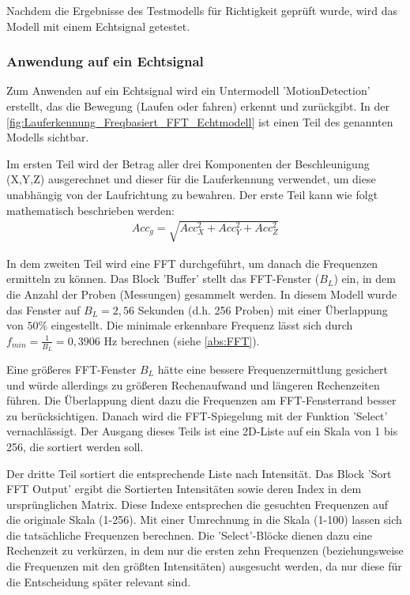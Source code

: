 Nachdem die Ergebnisse des Testmodells für Richtigkeit geprüft wurde, wird das Modell mit einem Echtsignal getestet. 

\subsubsection{Anwendung auf ein Echtsignal}

Zum Anwenden auf ein Echtsignal wird ein Untermodell 'MotionDetection' erstellt, das die Bewegung (Laufen oder fahren) erkennt und zurückgibt.
In der \autoref{fig:Lauferkennung_Freqbasiert_FFT_Echtmodell} ist einen Teil des genannten Modells sichtbar. 

Im ersten Teil wird der Betrag aller drei Komponenten der Beschleunigung (X,Y,Z) ausgerechnet und dieser für die Lauferkennung verwendet, um diese unabhängig von der Laufrichtung zu bewahren. Der erste Teil kann wie folgt mathematisch beschrieben werden:
\begin{align*}
	Acc_g = \sqrt{ Acc_X^2 + Acc_Y^2 + Acc_Z^2}
\end{align*}

In dem zweiten Teil wird eine FFT durchgeführt, um danach die Frequenzen ermitteln zu können. Das Block 'Buffer' stellt das FFT-Fenster ($B_L$) ein, in dem die Anzahl der Proben (Messungen) gesammelt werden. In diesem Modell wurde das Fenster auf $B_L = 2,56$ Sekunden (d.h. 256 Proben) mit einer Überlappung von $50\%$ eingestellt. Die minimale erkennbare Frequenz lässt sich durch $f_{min} = \frac{1}{B_L} = 0,3906$ Hz berechnen (siehe \autoref{abs:FFT}).

Eine größeres FFT-Fenster $B_L$ hätte eine bessere Frequenzermittlung gesichert und würde allerdings zu größeren Rechenaufwand und längeren Rechenzeiten führen. Die Überlappung dient dazu die Frequenzen am FFT-Fensterrand besser zu berücksichtigen. Danach wird die FFT-Spiegelung mit der Funktion 'Select' vernachlässigt. Der Ausgang dieses Teils ist eine 2D-Liste auf ein Skala von 1 bis 256, die sortiert werden soll.

Der dritte Teil sortiert die entsprechende Liste nach Intensität. Das Block 'Sort FFT Output' ergibt die Sortierten Intensitäten sowie deren Index in dem ursprünglichen Matrix. Diese Indexe entsprechen die gesuchten Frequenzen auf die originale Skala (1-256). Mit einer Umrechnung in die Skala (1-100) lassen sich die tatsächliche Frequenzen berechnen. Die 'Select'-Blöcke dienen dazu eine Rechenzeit zu verkürzen, in dem nur die ersten zehn Frequenzen (beziehungsweise die Frequenzen mit den größten Intensitäten) ausgesucht werden, da nur diese für die Entscheidung später relevant sind.

